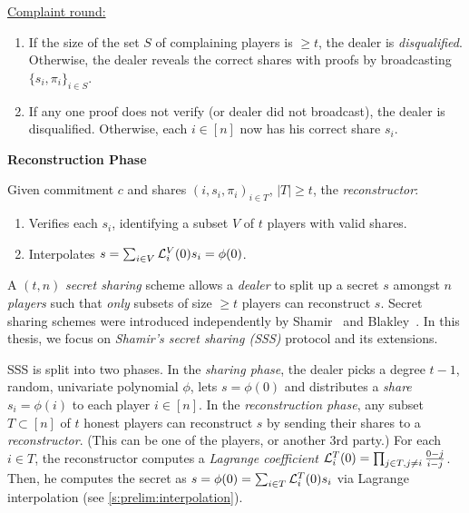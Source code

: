 {\begin{algorithm}[t]
    \underline{Complaint round:}
    \begin{enumerate}
        \item If the size of the set $S$ of complaining players is $\ge t$, the dealer is \textit{disqualified}.
              Otherwise, the dealer reveals the correct shares with proofs by broadcasting $\{s_i, \pi_i\}_{i\in S}$.
        \item If any one proof does not verify (or dealer did not broadcast), the dealer is disqualified. Otherwise, each $i\in [n]$ now has his correct share $s_i$.
    \end{enumerate}

    \begin{center}
        \textbf{Reconstruction Phase}
    \end{center}
    \vspace{-.5em}
    Given commitment $c$ and shares $(i, s_i,\pi_i)_{i\in T}$, $|T|\ge t$, the \textit{reconstructor}:
    \begin{enumerate}
        \item Verifies each $s_i$, identifying a subset $V$ of $t$ players with valid shares.
        \item Interpolates $s=\sum_{i\in V} \mathcal{L}_i^V(0) s_i=\phi(0)$.
    \end{enumerate}
\end{algorithm}
}

A $(t,n)$ \textit{secret sharing} scheme allows a \textit{dealer} to split up a secret $s$ amongst $n$ \textit{players} such that \textit{only} subsets of size $\ge t$ players can reconstruct $s$.
Secret sharing schemes were introduced independently by Shamir~\cite{Shamir79} and Blakley~\cite{Blakley79}.
In this thesis, we focus on \textit{Shamir's secret sharing (SSS)} protocol and its extensions.

SSS is split into two phases.
In the \textit{sharing phase}, the dealer picks a degree $t-1$, random, univariate polynomial $\phi$, lets $s=\phi(0)$ and distributes a \textit{share} $s_i = \phi(i)$ to each player $i\in [n]$.
In the \textit{reconstruction phase}, any subset $T\subset [n]$ of $t$ honest players can reconstruct $s$ by sending their shares to a \textit{reconstructor}.
(This can be one of the players, or another 3rd party.)
For each $i\in T$, the reconstructor computes a \textit{Lagrange coefficient} $\mathcal{L}_i^T(0) = \prod_{j\in T, j\ne i} {\frac{0-j}{i - j}}$.
Then, he computes the secret as $s = \phi(0) = \sum_{i\in T} \mathcal{L}_i^T(0) s_i$ via Lagrange interpolation (see \cref{s:prelim:interpolation}).


